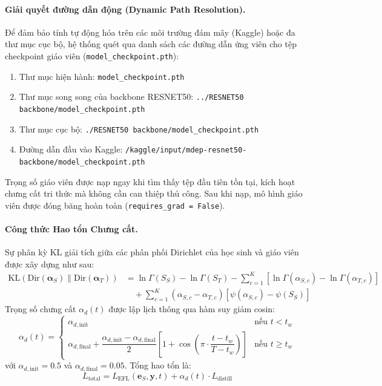 \documentclass[11pt, a4paper]{article}
\newcommand{\Dir}{\text{Dir}}
\newcommand{\KL}{\text{KL}}
\begin{document}
\paragraph{Giải quyết đường dẫn động (Dynamic Path Resolution).}
Để đảm bảo tính tự động hóa trên các môi trường đám mây (Kaggle) hoặc đa thư mục cục bộ, hệ thống quét qua danh sách các đường dẫn ứng viên cho tệp checkpoint giáo viên (\texttt{model\_checkpoint.pth}):
\begin{enumerate}
    \item Thư mục hiện hành: \texttt{model\_checkpoint.pth}
    \item Thư mục song song của backbone RESNET50: \texttt{../RESNET50 backbone/model\_checkpoint.pth}
    \item Thư mục cục bộ: \texttt{./RESNET50 backbone/model\_checkpoint.pth}
    \item Đường dẫn đầu vào Kaggle: \texttt{/kaggle/input/mdep-resnet50-backbone/model\_checkpoint.pth}
\end{enumerate}
Trọng số giáo viên được nạp ngay khi tìm thấy tệp đầu tiên tồn tại, kích hoạt chưng cất tri thức mà không cần can thiệp thủ công. Sau khi nạp, mô hình giáo viên được đóng băng hoàn toàn (\texttt{requires\_grad = False}).

\paragraph{Công thức Hao tổn Chưng cất.}
Sự phân kỳ KL giải tích giữa các phân phối Dirichlet của học sinh và giáo viên được xây dựng như sau:
\begin{align}
    \KL(\Dir(\bm{\alpha}_S) \| \Dir(\bm{\alpha}_T)) &= \ln\Gamma(S_S) - \ln\Gamma(S_T) - \sum_{c=1}^K \left[\ln\Gamma(\alpha_{S,c}) - \ln\Gamma(\alpha_{T,c})\right] \nonumber \\
    &\quad + \sum_{c=1}^K (\alpha_{S,c} - \alpha_{T,c})\left[\psi(\alpha_{S,c}) - \psi(S_S)\right] \label{eq:dir_kl_full}
\end{align}
Trọng số chưng cất $\alpha_d(t)$ được lập lịch thông qua hàm suy giảm cosin:
\begin{equation}\label{eq:alpha_d}
    \alpha_d(t) = \begin{cases}
        \alpha_{d,\text{init}} & \text{nếu } t < t_w \\[6pt]
        \alpha_{d,\text{final}} + \dfrac{\alpha_{d,\text{init}} - \alpha_{d,\text{final}}}{2}\left[1 + \cos\!\left(\pi \cdot \dfrac{t - t_w}{T - t_w}\right)\right] & \text{nếu } t \ge t_w
    \end{cases}
\end{equation}
với $\alpha_{d,\text{init}} = 0.5$ và $\alpha_{d,\text{final}} = 0.05$. Tổng hao tổn là:
\begin{equation}\label{eq:total_loss}
    L_{\text{total}} = L_{\text{EFL}}(\bm{e}_S, \bm{y}, t) + \alpha_d(t) \cdot L_{\text{distill}}
\end{equation}
\end{document}
